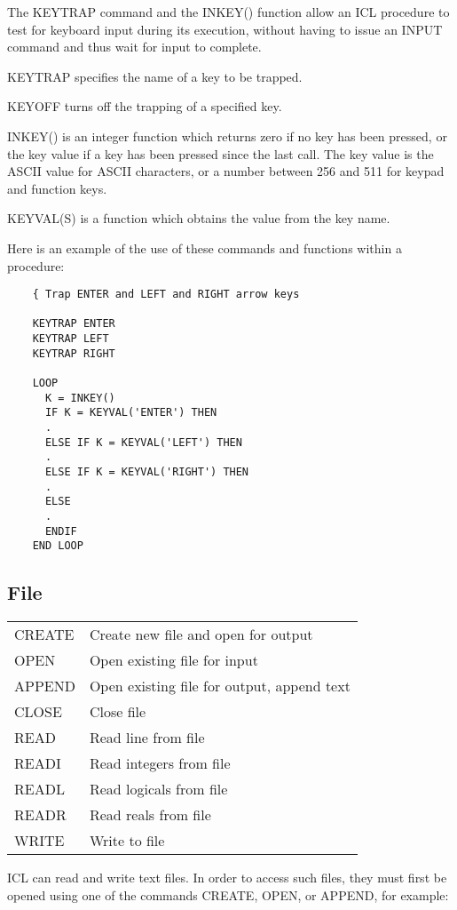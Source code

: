 The KEYTRAP command and the INKEY() function allow an ICL procedure to test
for keyboard input during its execution, without having to issue an INPUT
command and thus wait for input to complete.

KEYTRAP specifies the name of a key to be trapped.

KEYOFF turns off the trapping of a specified key.

INKEY() is an integer function which returns zero if no key has been pressed, or
the key value if a key has been pressed since the last call.
The key value is the ASCII value for ASCII characters, or a number between 256
and 511 for keypad and function keys.

KEYVAL(S) is a function which obtains the value from the key name.

Here is an example of the use of these commands and functions within a
procedure:

\begin{small}
\begin{verbatim}
    { Trap ENTER and LEFT and RIGHT arrow keys

    KEYTRAP ENTER
    KEYTRAP LEFT
    KEYTRAP RIGHT
                                              
    LOOP
      K = INKEY()
      IF K = KEYVAL('ENTER') THEN
      .
      ELSE IF K = KEYVAL('LEFT') THEN
      .
      ELSE IF K = KEYVAL('RIGHT') THEN
      .
      ELSE
      .
      ENDIF
    END LOOP
\end{verbatim}
\end{small}

\subsection{File}

\begin{center}
\begin{tabular}{|l|l|}
\hline
CREATE   & Create new file and open for output \\
OPEN     & Open existing file for input \\
APPEND   & Open existing file for output, append text \\
CLOSE    & Close file \\
\hline
READ     & Read line from file \\
READI    & Read integers from file \\
READL    & Read logicals from file \\
READR    & Read reals from file \\
\hline
WRITE    & Write to file \\
\hline
\end{tabular}
\end{center}
ICL can read and write text files.
In order to access such files, they must first be opened using one of the
commands CREATE, OPEN, or APPEND, for example:

